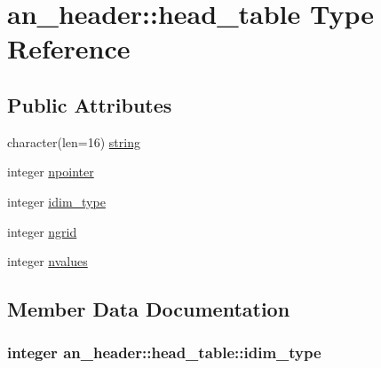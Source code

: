\hypertarget{structan__header_1_1head__table}{}\section{an\+\_\+header\+:\+:head\+\_\+table Type Reference}
\label{structan__header_1_1head__table}
\subsection*{Public Attributes}
\begin{DoxyCompactItemize}
\item 
character(len=16) \hyperlink{structan__header_1_1head__table_a1be9d5f56131baf037a9da190f74189e}{string}
\item 
integer \hyperlink{structan__header_1_1head__table_ad73cf9ac7e4131420e4303aa425b183f}{npointer}
\item 
integer \hyperlink{structan__header_1_1head__table_a2c0e5e1896dce4260004d928663c8861}{idim\+\_\+type}
\item 
integer \hyperlink{structan__header_1_1head__table_acc79dab7891f45424b13bf4f0f179585}{ngrid}
\item 
integer \hyperlink{structan__header_1_1head__table_a75d0ca98f45425fdb8df177b5c2458e5}{nvalues}
\end{DoxyCompactItemize}


\subsection{Member Data Documentation}
\hypertarget{structan__header_1_1head__table_a2c0e5e1896dce4260004d928663c8861}{}
\subsubsection[{idim\+\_\+type}]{\setlength{\rightskip}{0pt plus 5cm}integer an\+\_\+header\+::head\+\_\+table\+::idim\+\_\+type}\label{structan__header_1_1head__table_a2c0e5e1896dce4260004d928663c8861}
\hypertarget{structan__header_1_1head__table_acc79dab7891f45424b13bf4f0f179585}{}
